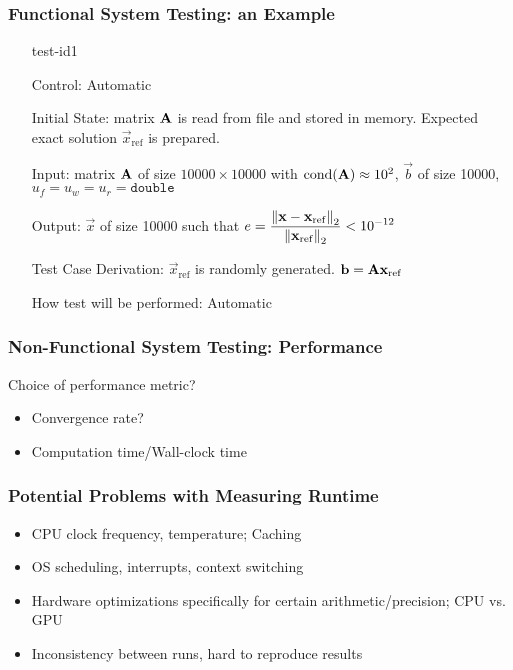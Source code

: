 \documentclass[t,12pt,numbers,fleqn]{beamer}
\begin{document}
\begin{frame}
\frametitle{Functional System Testing: an Example}

\begin{enumerate}

\item[test-id1]

Control: Automatic

Initial State: matrix \(\mathbf{A}\) is read from file and stored in memory.
Expected exact solution \(\vec{x}_\mathrm{ref}\) is prepared.

Input: matrix \(\mathbf{A}\) of size \(\num{10000} \times \num{10000}\) with
\(\mathrm{cond}(\mathbf{A}) \approx \num{1e2}\), \(\vec{b}\) of size \num{10000}, \(u_f =
u_w = u_r = \texttt{double}\)

Output: \(\vec{x}\) of size \num{10000} such that \(e = \displaystyle \frac{\left\lVert\mathbf{x} -
    \mathbf{x}_\mathrm{ref}\right\rVert_2}{\left\lVert\mathbf{x}_\mathrm{ref}\right\rVert_2} < \num{1e-12}\)

Test Case Derivation: \(\vec{x}_\mathrm{ref}\) is randomly generated. \(\mathbf{b} = \mathbf{A}\mathbf{x}_\mathrm{ref}\)

How test will be performed: Automatic

\end{enumerate}
\end{frame}


\begin{frame}
\frametitle{Non-Functional System Testing: Performance}

Choice of performance metric?

\begin{itemize}
\item Convergence rate?
\item Computation time/Wall-clock time
\end{itemize}

\end{frame}


\begin{frame}
\frametitle{Potential Problems with Measuring Runtime}

\begin{itemize}
\item CPU clock frequency, temperature; Caching
\item OS scheduling, interrupts, context switching
\item Hardware optimizations specifically for certain arithmetic/precision; CPU vs.
  GPU
\item Inconsistency between runs, hard to reproduce results
\end{itemize}

\end{frame}
\end{document}
